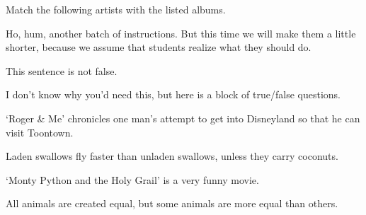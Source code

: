 \documentclass[10pt]{examdesign}
\begin{document}
\begin{matching}[title={Musicology 101}]
  Match the following artists with the listed albums.
\end{matching}

\begin{truefalse}[title={True/False (5 pts each)},
                  resetcounter=yes,suppressprefix]
  Ho, hum, another batch of instructions.  But this time we will make them a
  little shorter, because we assume that students realize what they should do.

\begin{question}
   This sentence is not false.
\end{question}

\begin{block}
  I don't know why you'd need this, but here is a block of true/false
  questions. 
  \begin{question}
     `Roger \& Me' chronicles one man's attempt to get into
    Disneyland so that he can visit Toontown.
  \end{question}
  
  \begin{question}
     Laden swallows fly faster than unladen swallows, unless
    they carry coconuts.
  \end{question}
\end{block}

\begin{question}
   `Monty Python and the Holy Grail' is a very funny movie.
\end{question}

\begin{question}
   All animals are created equal, but some animals are more
  equal than others.
\end{question}
\end{truefalse}
\end{document}
